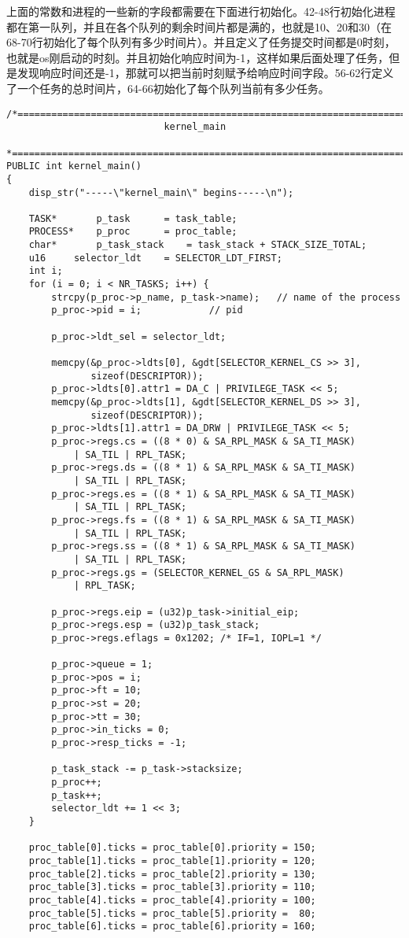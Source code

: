 \documentclass{whureport}
\begin{document}
上面的常数和进程的一些新的字段都需要在下面进行初始化。42-48行初始化进程都在第一队列，并且在各个队列的剩余时间片都是满的，也就是10、20和30（在68-70行初始化了每个队列有多少时间片）。并且定义了任务提交时间都是0时刻，也就是os刚启动的时刻。并且初始化响应时间为-1，这样如果后面处理了任务，但是发现响应时间还是-1，那就可以把当前时刻赋予给响应时间字段。56-62行定义了一个任务的总时间片，64-66初始化了每个队列当前有多少任务。
\begin{lstlisting}
/*======================================================================*
                            kernel_main
 *======================================================================*/
PUBLIC int kernel_main()
{
	disp_str("-----\"kernel_main\" begins-----\n");

	TASK*		p_task		= task_table;
	PROCESS*	p_proc		= proc_table;
	char*		p_task_stack	= task_stack + STACK_SIZE_TOTAL;
	u16		selector_ldt	= SELECTOR_LDT_FIRST;
	int i;
	for (i = 0; i < NR_TASKS; i++) {
		strcpy(p_proc->p_name, p_task->name);	// name of the process
		p_proc->pid = i;			// pid

		p_proc->ldt_sel = selector_ldt;

		memcpy(&p_proc->ldts[0], &gdt[SELECTOR_KERNEL_CS >> 3],
		       sizeof(DESCRIPTOR));
		p_proc->ldts[0].attr1 = DA_C | PRIVILEGE_TASK << 5;
		memcpy(&p_proc->ldts[1], &gdt[SELECTOR_KERNEL_DS >> 3],
		       sizeof(DESCRIPTOR));
		p_proc->ldts[1].attr1 = DA_DRW | PRIVILEGE_TASK << 5;
		p_proc->regs.cs	= ((8 * 0) & SA_RPL_MASK & SA_TI_MASK)
			| SA_TIL | RPL_TASK;
		p_proc->regs.ds	= ((8 * 1) & SA_RPL_MASK & SA_TI_MASK)
			| SA_TIL | RPL_TASK;
		p_proc->regs.es	= ((8 * 1) & SA_RPL_MASK & SA_TI_MASK)
			| SA_TIL | RPL_TASK;
		p_proc->regs.fs	= ((8 * 1) & SA_RPL_MASK & SA_TI_MASK)
			| SA_TIL | RPL_TASK;
		p_proc->regs.ss	= ((8 * 1) & SA_RPL_MASK & SA_TI_MASK)
			| SA_TIL | RPL_TASK;
		p_proc->regs.gs	= (SELECTOR_KERNEL_GS & SA_RPL_MASK)
			| RPL_TASK;

		p_proc->regs.eip = (u32)p_task->initial_eip;
		p_proc->regs.esp = (u32)p_task_stack;
		p_proc->regs.eflags = 0x1202; /* IF=1, IOPL=1 */

		p_proc->queue = 1;
		p_proc->pos = i;
		p_proc->ft = 10;
		p_proc->st = 20;
		p_proc->tt = 30;
        p_proc->in_ticks = 0;
        p_proc->resp_ticks = -1;

		p_task_stack -= p_task->stacksize;
		p_proc++;
		p_task++;
		selector_ldt += 1 << 3;
	}

	proc_table[0].ticks = proc_table[0].priority = 150;
	proc_table[1].ticks = proc_table[1].priority = 120;
	proc_table[2].ticks = proc_table[2].priority = 130;
	proc_table[3].ticks = proc_table[3].priority = 110;
	proc_table[4].ticks = proc_table[4].priority = 100;
	proc_table[5].ticks = proc_table[5].priority =  80;
	proc_table[6].ticks = proc_table[6].priority = 160;


\end{lstlisting}
\end{document}
